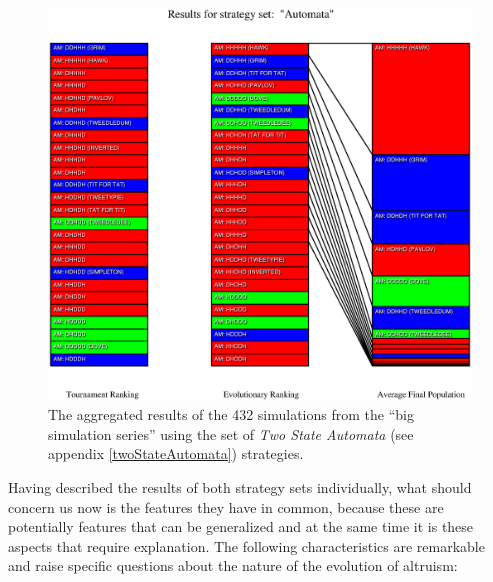 \begin{figure}
\begin{center}
\includegraphics[width=20cm]{images/BigSeries_AM.eps} %
\caption{\label{BigSimGlobalResultsAM} The aggregated results of the 432
  simulations from the ``big simulation series'' using the set of {\em
  Two State Automata} (see appendix \ref{twoStateAutomata}) strategies.}
\end{center}
\end{figure}

Having described the results of both strategy sets individually, what should
concern us now is the features they have in common, because these are
potentially features that can be generalized and at the same time it is these
aspects that require explanation. The following characteristics are remarkable
and raise specific questions about the nature of the evolution of altruism:

